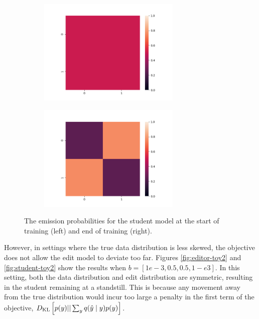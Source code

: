 \documentclass[11pt]{article}
\begin{document}
\begin{figure}[h]
\centering
\begin{subfigure}[t]{0.45\textwidth}
\centering
\includegraphics[height=2in]{../plots/very_uneven_prior_student_init.png}
\end{subfigure}
\begin{subfigure}[t]{0.45\textwidth}
\centering
\includegraphics[height=2in]{../plots/very_uneven_prior_student_final.png}
\end{subfigure}
\caption{
\label{fig:student-toy}
The emission probabilities for the student model at the start of training (left)
and end of training (right).
}
\end{figure}

However, in settings where the true data distribution is less skewed,
the objective does not allow the edit model to deviate too far.
Figures \ref{fig:editor-toy2} and \ref{fig:student-toy2} show the results
when $b = [1e-3, 0.5, 0.5, 1-e3]$.
In this setting, both the data distribution and edit distribution are symmetric,
resulting in the student remaining at a standstill.
This is because any movement away from the true distribution would incur
too large a penalty in the first term of the objective,
$D_\mathrm{KL}\left[p(y) || \sum_y q(\hat{y} \mid y)p(y)\right]$.
\end{document}
